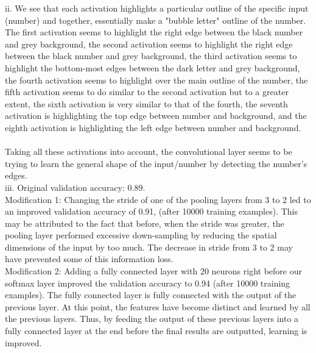 \documentclass[12 pt]{article}
\begin{document}
	\noindent ii. We see that each activation highlights a particular outline of the specific input (number) and together, essentially make a "bubble letter" outline of the number. The first activation seems to highlight the right edge between the black number and grey background, the second activation seems to highlight the right edge between the black number and grey background, the third activation seems to highlight the bottom-most edges between the dark letter and grey background, the fourth activation seems to highlight over the main outline of the number, the fifth activation seems to do similar to the second activation but to a greater extent, the sixth activation is very similar to that of the fourth, the seventh activation is highlighting the top edge between number and background, and the eighth activation is highlighting the left edge between number and background. \\ \\
	\noindent Taking all these activations into account, the convolutional layer seems to be trying to learn the general shape of the input/number by detecting the number's edges. \\
	
	\noindent iii. Original validation accuracy: 0.89. \\
	
	 \noindent Modification 1: Changing the stride of one of the pooling layers from 3 to 2 led to an improved validation accuracy of 0.91, (after 10000 training examples). This may be attributed to the fact that before, when the stride was greater, the pooling layer performed excessive down-sampling by reducing the spatial dimensions of the input by too much. The decrease in stride from 3 to 2 may have prevented some of this information loss. \\
	 
	 \noindent Modification 2: Adding a fully connected layer with 20 neurons right before our softmax layer improved the validation accuracy to 0.94 (after 10000 training examples). The fully connected layer is fully connected with the output of the previous layer. At this point, the features have become distinct and learned by all the previous layers. Thus, by feeding the output of these previous layers into a fully connected layer at the end before the final results are outputted, learning is improved. 
\end{document}
